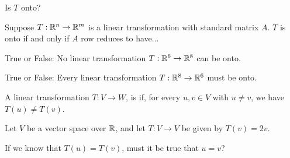 Is $T$ onto?  



\edXsolution{ 

}

\endedxproblem




Suppose $T: \mathbb R^n \rightarrow \mathbb R^m$ is a linear transformation with standard matrix $A$.  
$T$ is onto if and only if $A$ row reduces to have...



\edXsolution{

}

\endedxproblem





True or False: No linear transformation $T: \mathbb R^6 \rightarrow \mathbb R^8$ can be onto.  


True or False: Every linear transformation $T: \mathbb R^8 \rightarrow \mathbb R^6$ must be onto.  


\edXsolution{ 

}
\endedxproblem

\endedxvertical






\endedxvertical






{}  
A linear transformation $T: V\rightarrow W$, is  {} if, for every $u, v\in V$ with $u\ne v$,
we have $T(u) \ne T(v)$.  

\endedxtext



Let $V$ be a vector space over $\mathbb R$, and let $T: V\rightarrow V$ be given by $T(v) = 2v$.  

If we know that $T(u) = T(v)$, must it be true that $u = v$?  

